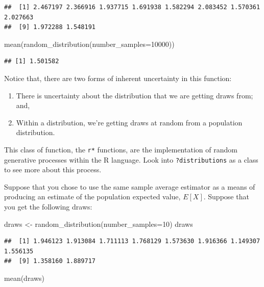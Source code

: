 \documentclass[
]{book}
\newenvironment{Shaded}{\begin{snugshade}}{\end{snugshade}}
\newcommand{\AttributeTok}[1]{\textcolor[rgb]{0.77,0.63,0.00}{#1}}
\newcommand{\DecValTok}[1]{\textcolor[rgb]{0.00,0.00,0.81}{#1}}
\newcommand{\FunctionTok}[1]{\textcolor[rgb]{0.00,0.00,0.00}{#1}}
\newcommand{\NormalTok}[1]{#1}
\newcommand{\OtherTok}[1]{\textcolor[rgb]{0.56,0.35,0.01}{#1}}
\providecommand{\tightlist}{%
  \setlength{\itemsep}{0pt}\setlength{\parskip}{0pt}}
\theoremstyle{definition}
\theoremstyle{definition}
\theoremstyle{definition}
\theoremstyle{definition}
\theoremstyle{remark}
\begin{document}
\begin{verbatim}
##  [1] 2.467197 2.366916 1.937715 1.691938 1.582294 2.083452 1.570361 2.027663
##  [9] 1.972288 1.548191
\end{verbatim}

\begin{Shaded}
\begin{Highlighting}[]
\FunctionTok{mean}\NormalTok{(}\FunctionTok{random\_distribution}\NormalTok{(}\AttributeTok{number\_samples=}\DecValTok{10000}\NormalTok{))}
\end{Highlighting}
\end{Shaded}

\begin{verbatim}
## [1] 1.501582
\end{verbatim}

Notice that, there are two forms of inherent uncertainty in this function:

\begin{enumerate}
\def\labelenumi{\arabic{enumi}.}
\tightlist
\item
  There is uncertainty about the distribution that we are getting draws from; and,
\item
  Within a distribution, we're getting draws at random from a population distribution.
\end{enumerate}

This class of function, the \texttt{r*} functions, are the implementation of random generative processes within the R language. Look into \texttt{?distributions} as a class to see more about this process.

Suppose that you chose to use the same sample average estimator as a means of producing an estimate of the population expected value, \(E[X]\). Suppose that you get the following draws:

\begin{Shaded}
\begin{Highlighting}[]
\NormalTok{draws }\OtherTok{\textless{}{-}} \FunctionTok{random\_distribution}\NormalTok{(}\AttributeTok{number\_samples=}\DecValTok{10}\NormalTok{)}
\NormalTok{draws}
\end{Highlighting}
\end{Shaded}

\begin{verbatim}
##  [1] 1.946123 1.913084 1.711113 1.768129 1.573630 1.916366 1.149307 1.556135
##  [9] 1.358160 1.889717
\end{verbatim}

\begin{Shaded}
\begin{Highlighting}[]
\FunctionTok{mean}\NormalTok{(draws)}
\end{Highlighting}
\end{Shaded}
\end{document}
